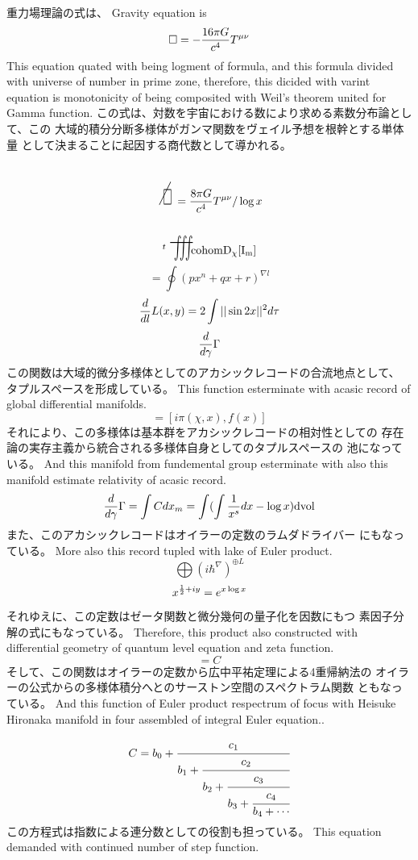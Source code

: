 \documentclass{jsarticle}
\begin{document}
 重力場理論の式は、
  Gravity equation is
  $$ \square = - {16 \pi G \over c^4}T^{\mu\nu} $$
  This equation quated with being logment of formula, and
  this formula divided with universe of number in prime zone,
  therefore, this dicided with varint equation is monotonicity of
  being composited with Weil's theorem united for Gamma function.
  この式は、対数を宇宙における数により求める素数分布論として、この
  大域的積分分断多様体がガンマ関数をヴェイル予想を根幹とする単体量
  として決まることに起因する商代数として導かれる。
  $$ \scalebox{1}[2]{\alearletter} = 
  {{{{8 \pi G} \over {c^4}}T^{\mu\nu}}/ \log x} $$
  $$ {}^{t}\scalebox{1}[2]{\variiint}\mathrm{cohom D_{\chi}[I_m]}$$
  $$ = \oint {(px^n + qx + r)^{\nabla l}} $$
  $$ {d \over d l}L(x,y) = 2 \int ||\sin 2x||^{2}d \tau $$
  $$ {d \over d \gamma}\Gamma $$
  この関数は大域的微分多様体としてのアカシックレコードの合流地点として、
  タプルスペースを形成している。
  This function esterminate with acasic record of global differential
  manifolds.
  $$ = [i \pi (\chi, x), f(x)] $$
  それにより、この多様体は基本群をアカシックレコードの相対性としての
  存在論の実存主義から統合される多様体自身としてのタプルスペースの
  池になっている。
  And this manifold from fundemental group esterminate with
  also this manifold estimate relativity of acasic record.
  $$ {d \over d \gamma}\Gamma = \int C dx_m = \int(\int {1 \over x^s}dx
  - \log x)\mathrm{dvol} $$
  また、このアカシックレコードはオイラーの定数のラムダドライバー
  にもなっている。
  More also this record tupled with lake of Euler product.
  $$ \bigoplus({i \hbar^{\nabla}})^{\oplus L} $$
  $$ x^{{1 \over 2} + iy} = e^{x \log x} $$
  それゆえに、この定数はゼータ関数と微分幾何の量子化を因数にもつ
  素因子分解の式にもなっている。
  Therefore, this product also constructed with differential geometry
  of quantum level equation and zeta function.
  $$ = C $$ 
  そして、この関数はオイラーの定数から広中平祐定理による4重帰納法の
  オイラーの公式からの多様体積分へとのサーストン空間のスペクトラム関数
  ともなっている。
  And this function of Euler product respectrum of focus with
  Heisuke Hironaka manifold in four assembled of integral Euler equation.. 

  $$ C =  b_0 + \cfrac{c_1}{b_1 +
	  \cfrac{c_2}{b_2 +
	  \cfrac{c_3}{b_3 +
	  \cfrac{c_4}{b_4 + \cdots}}}} $$
  この方程式は指数による連分数としての役割も担っている。  
  This equation demanded with continued number of step function.
\end{document}
